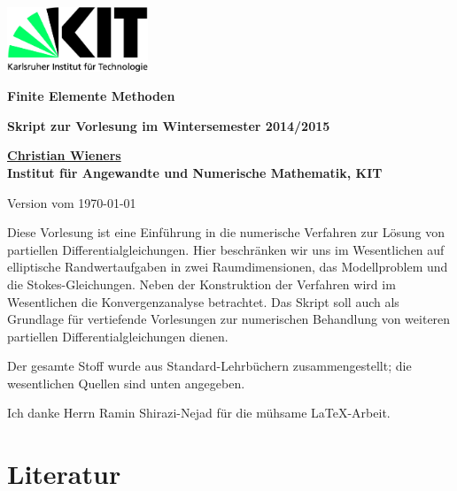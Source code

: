 \pagestyle{empty}

\includegraphics[width=4.2cm]{kit-logo}    

\vspace{79.385mm}


\vspace{9.385mm}

\vspace{2mm}

{\LARGE\bf Finite Elemente Methoden}

\vspace{9.385mm}

{\bf Skript zur Vorlesung im Wintersemester 2014/2015}

\vspace{9.385mm}

\href{http://www.mathematik.uni-karlsruhe.de/ianm3/~wieners}
{{\large\bf Christian Wieners }}\\[2mm]
{\bf Institut für Angewandte und Numerische Mathematik, KIT}

\vspace{9.385mm}

{Version vom \today}

\clearpage

\tableofcontents

\clearpage

Diese Vorlesung ist eine Einführung in die 
numerische Verfahren zur Lösung von partiellen Differentialgleichungen.
Hier beschränken wir uns im Wesentlichen auf elliptische 
Randwertaufgaben in zwei Raumdimensionen, das Modellproblem und die 
Stokes-Gleichungen. Neben der Konstruktion der Verfahren wird im
Wesentlichen die Konvergenzanalyse betrachtet. Das Skript soll auch als
Grundlage für vertiefende Vorlesungen zur numerischen Behandlung 
von weiteren partiellen Differentialgleichungen dienen.

Der gesamte Stoff wurde aus Standard-Lehrbüchern zusammengestellt;
die wesentlichen Quellen sind unten angegeben.

Ich danke Herrn Ramin
Shirazi-Nejad für die mühsame \LaTeX-Arbeit.

\section*{Literatur}

